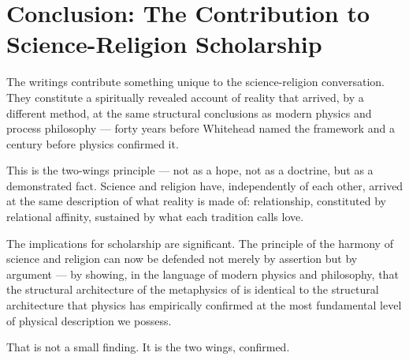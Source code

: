 
\section{Conclusion: The \bahai Contribution to Science-Religion Scholarship}
\label{sec:conclusion}


The \bahai writings contribute something unique to the science-religion
conversation.
They constitute a spiritually revealed account of reality that arrived,
by a different method, at the same structural conclusions as modern physics
and process philosophy --- forty years before Whitehead named the framework
and a century before physics confirmed it.

This is the two-wings principle --- not as a hope, not as a doctrine, but as
a demonstrated fact.
Science and religion have, independently of each other, arrived at the same
description of what reality is made of: relationship, constituted by relational
affinity, sustained by what each tradition calls love.

The implications for \bahai scholarship are significant.
The principle of the harmony of science and religion can now be defended not
merely by assertion but by argument --- by showing, in the language of modern
physics and philosophy, that the structural architecture of the \bahai
metaphysics of \mahabbat is identical to the structural architecture that
physics has empirically confirmed at the most fundamental level of physical
description we possess.

That is not a small finding.
It is the two wings, confirmed.
